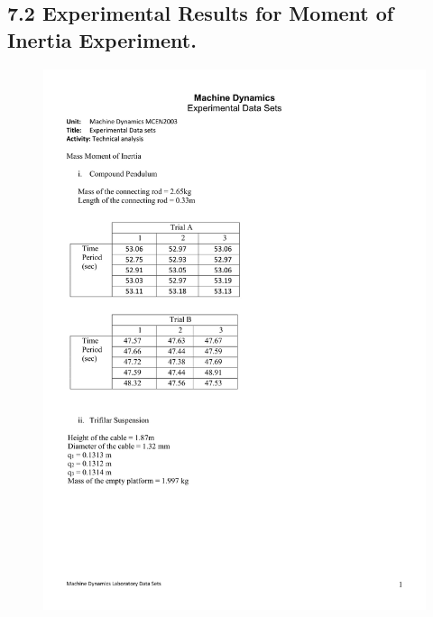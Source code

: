 \documentclass[12pt,a4paper]{report}
\begin{document}
\subsection*{7.2  Experimental Results for Moment of Inertia Experiment.}
\begin{figure}[H]
  \includegraphics[width=\linewidth]{dataset/mass1}
  \caption*{}
\label{}
\end{figure}
\end{document}
